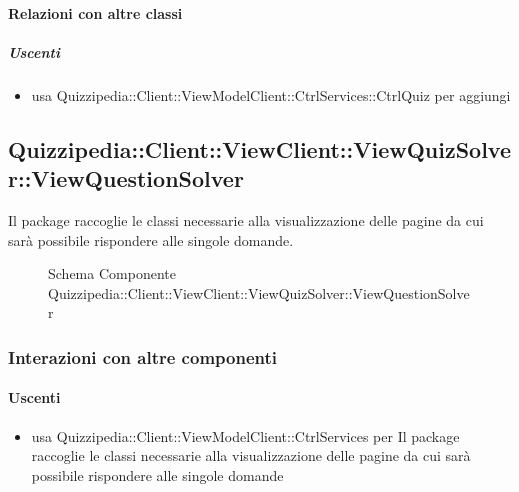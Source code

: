 \paragraph{Relazioni con altre classi}
\subparagraph{Uscenti}
\begin{itemize}
\item usa Quizzipedia::Client::ViewModelClient::CtrlServices::CtrlQuiz per aggiungi
\end{itemize}
\subsection{Quizzipedia::Client::ViewClient::ViewQuizSolver::ViewQuestionSolver}
Il package raccoglie le classi necessarie alla visualizzazione delle pagine da cui sarà possibile rispondere alle singole domande.
\begin{figure}[H]
\centering
\noindent{}
\caption[Schema Componente Quizzipedia::Client::ViewClient::ViewQuizSolver::ViewQuestionSolver]{Schema Componente Quizzipedia::Client::ViewClient::ViewQuizSolver::ViewQuestionSolver}
\end{figure}
\subsubsection{Interazioni con altre componenti}
\paragraph{Uscenti}
\begin{itemize}
\item usa Quizzipedia::Client::ViewModelClient::CtrlServices per Il package raccoglie le classi necessarie alla visualizzazione delle pagine da cui sarà possibile rispondere alle singole domande
\end{itemize}
